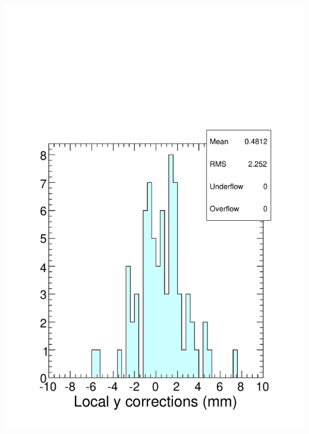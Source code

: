 \documentclass[compress]{beamer}
\begin{document}
\begin{frame}
\begin{columns}
\includegraphics[width=\linewidth]{corrections_y.pdf}


\end{columns}
\end{frame}
\end{document}
